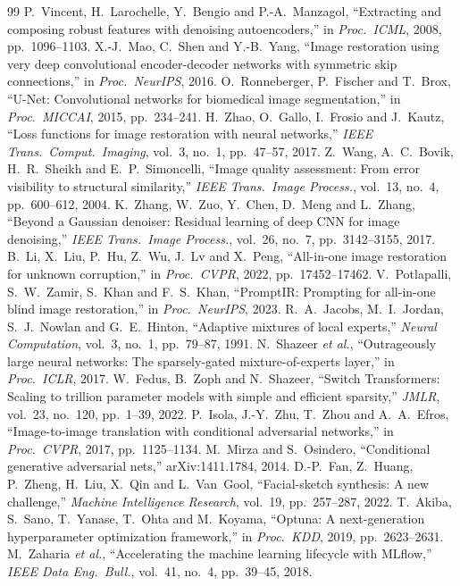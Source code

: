 \documentclass[conference]{IEEEtran}
\begin{document}

\begin{thebibliography}{99}
 P.~Vincent, H.~Larochelle, Y.~Bengio and P.-A.~Manzagol, ``Extracting and composing robust features with denoising autoencoders,'' in \emph{Proc.\ ICML}, 2008, pp.~1096--1103.
 X.-J.~Mao, C.~Shen and Y.-B.~Yang, ``Image restoration using very deep convolutional encoder-decoder networks with symmetric skip connections,'' in \emph{Proc.\ NeurIPS}, 2016.
 O.~Ronneberger, P.~Fischer and T.~Brox, ``U-Net: Convolutional networks for biomedical image segmentation,'' in \emph{Proc.\ MICCAI}, 2015, pp.~234--241.
 H.~Zhao, O.~Gallo, I.~Frosio and J.~Kautz, ``Loss functions for image restoration with neural networks,'' \emph{IEEE Trans.\ Comput.\ Imaging}, vol.~3, no.~1, pp.~47--57, 2017.
 Z.~Wang, A.~C.~Bovik, H.~R.~Sheikh and E.~P.~Simoncelli, ``Image quality assessment: From error visibility to structural similarity,'' \emph{IEEE Trans.\ Image Process.}, vol.~13, no.~4, pp.~600--612, 2004.
 K.~Zhang, W.~Zuo, Y.~Chen, D.~Meng and L.~Zhang, ``Beyond a Gaussian denoiser: Residual learning of deep CNN for image denoising,'' \emph{IEEE Trans.\ Image Process.}, vol.~26, no.~7, pp.~3142--3155, 2017.
 B.~Li, X.~Liu, P.~Hu, Z.~Wu, J.~Lv and X.~Peng, ``All-in-one image restoration for unknown corruption,'' in \emph{Proc.\ CVPR}, 2022, pp.~17452--17462.
 V.~Potlapalli, S.~W.~Zamir, S.~Khan and F.~S.~Khan, ``PromptIR: Prompting for all-in-one blind image restoration,'' in \emph{Proc.\ NeurIPS}, 2023.
 R.~A.~Jacobs, M.~I.~Jordan, S.~J.~Nowlan and G.~E.~Hinton, ``Adaptive mixtures of local experts,'' \emph{Neural Computation}, vol.~3, no.~1, pp.~79--87, 1991.
 N.~Shazeer \emph{et al.}, ``Outrageously large neural networks: The sparsely-gated mixture-of-experts layer,'' in \emph{Proc.\ ICLR}, 2017.
 W.~Fedus, B.~Zoph and N.~Shazeer, ``Switch Transformers: Scaling to trillion parameter models with simple and efficient sparsity,'' \emph{JMLR}, vol.~23, no.~120, pp.~1--39, 2022.
 P.~Isola, J.-Y.~Zhu, T.~Zhou and A.~A.~Efros, ``Image-to-image translation with conditional adversarial networks,'' in \emph{Proc.\ CVPR}, 2017, pp.~1125--1134.
 M.~Mirza and S.~Osindero, ``Conditional generative adversarial nets,'' arXiv:1411.1784, 2014.
 D.-P.~Fan, Z.~Huang, P.~Zheng, H.~Liu, X.~Qin and L.~Van~Gool, ``Facial-sketch synthesis: A new challenge,'' \emph{Machine Intelligence Research}, vol.~19, pp.~257--287, 2022.
 T.~Akiba, S.~Sano, T.~Yanase, T.~Ohta and M.~Koyama, ``Optuna: A next-generation hyperparameter optimization framework,'' in \emph{Proc.\ KDD}, 2019, pp.~2623--2631.
 M.~Zaharia \emph{et al.}, ``Accelerating the machine learning lifecycle with MLflow,'' \emph{IEEE Data Eng.\ Bull.}, vol.~41, no.~4, pp.~39--45, 2018.
\end{thebibliography}
\end{document}
